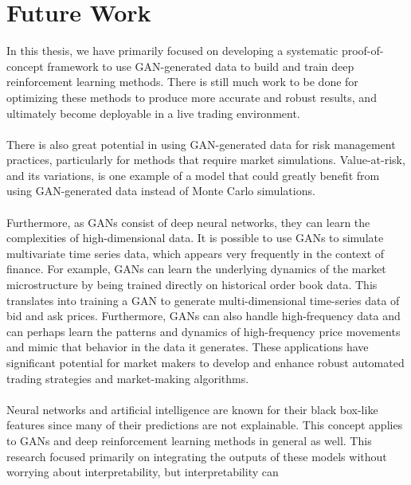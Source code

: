 \section{Future Work}
In this thesis, we have primarily focused on developing a systematic proof-of-concept framework to use GAN-generated data to build and train deep reinforcement learning methods. There is still much work to be done for optimizing these methods to produce more accurate and robust results, and ultimately become deployable in a live trading environment.
\\
\\
There is also great potential in using GAN-generated data for risk management practices, particularly for methods that require market simulations. Value-at-risk, and its variations, is one example of a model that could greatly benefit from using GAN-generated data instead of Monte Carlo simulations.
\\
\\
Furthermore, as GANs consist of deep neural networks, they can learn the complexities of high-dimensional data. It is possible to use GANs to simulate multivariate time series data, which appears very frequently in the context of finance. For example, GANs can learn the underlying dynamics of the market microstructure by being trained directly on historical order book data. This translates into training a GAN to generate multi-dimensional time-series data of bid and ask prices. Furthermore, GANs can also handle high-frequency data and can perhaps learn the patterns and dynamics of high-frequency price movements and mimic that behavior in the data it generates. These applications have significant potential for market makers to develop and enhance robust automated trading strategies and market-making algorithms.
\\
\\
Neural networks and artificial intelligence are known for their black box-like features since many of their predictions are not explainable. This concept applies to GANs and deep reinforcement learning methods in general as well. This research focused primarily on integrating the outputs of these models without worrying about interpretability, but interpretability can 


